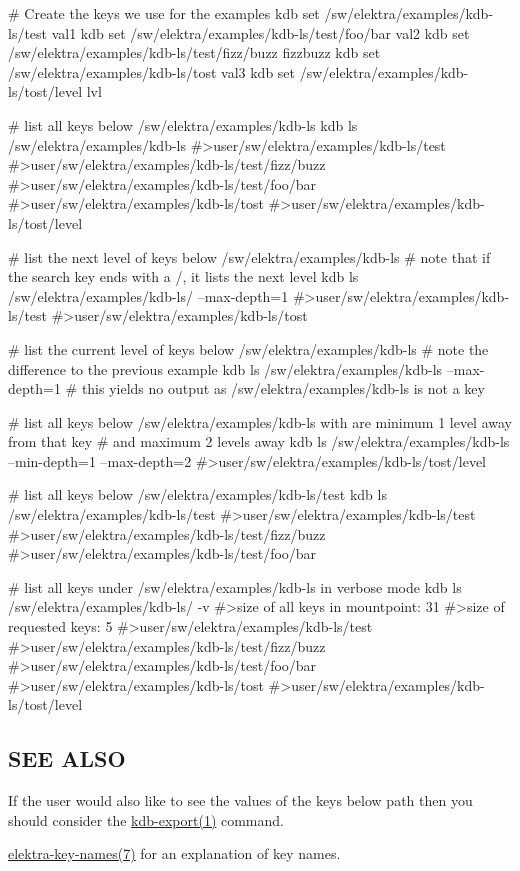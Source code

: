 \begin{DoxyCode}
# Create the keys we use for the examples
kdb set /sw/elektra/examples/kdb-ls/test val1
kdb set /sw/elektra/examples/kdb-ls/test/foo/bar val2
kdb set /sw/elektra/examples/kdb-ls/test/fizz/buzz fizzbuzz
kdb set /sw/elektra/examples/kdb-ls/tost val3
kdb set /sw/elektra/examples/kdb-ls/tost/level lvl 

# list all keys below /sw/elektra/examples/kdb-ls
kdb ls /sw/elektra/examples/kdb-ls
#>user/sw/elektra/examples/kdb-ls/test
#>user/sw/elektra/examples/kdb-ls/test/fizz/buzz
#>user/sw/elektra/examples/kdb-ls/test/foo/bar
#>user/sw/elektra/examples/kdb-ls/tost
#>user/sw/elektra/examples/kdb-ls/tost/level

# list the next level of keys below /sw/elektra/examples/kdb-ls
# note that if the search key ends with a /, it lists the next level
kdb ls /sw/elektra/examples/kdb-ls/ --max-depth=1
#>user/sw/elektra/examples/kdb-ls/test
#>user/sw/elektra/examples/kdb-ls/tost

# list the current level of keys below /sw/elektra/examples/kdb-ls
# note the difference to the previous example
kdb ls /sw/elektra/examples/kdb-ls --max-depth=1
# this yields no output as /sw/elektra/examples/kdb-ls is not a key

# list all keys below /sw/elektra/examples/kdb-ls with are minimum 1 level away from that key
# and maximum 2 levels away
kdb ls /sw/elektra/examples/kdb-ls --min-depth=1 --max-depth=2
#>user/sw/elektra/examples/kdb-ls/tost/level

# list all keys below /sw/elektra/examples/kdb-ls/test
kdb ls /sw/elektra/examples/kdb-ls/test
#>user/sw/elektra/examples/kdb-ls/test
#>user/sw/elektra/examples/kdb-ls/test/fizz/buzz
#>user/sw/elektra/examples/kdb-ls/test/foo/bar

# list all keys under /sw/elektra/examples/kdb-ls in verbose mode
kdb ls /sw/elektra/examples/kdb-ls/ -v
#>size of all keys in mountpoint: 31
#>size of requested keys: 5
#>user/sw/elektra/examples/kdb-ls/test
#>user/sw/elektra/examples/kdb-ls/test/fizz/buzz
#>user/sw/elektra/examples/kdb-ls/test/foo/bar
#>user/sw/elektra/examples/kdb-ls/tost
#>user/sw/elektra/examples/kdb-ls/tost/level
\end{DoxyCode}


\subsection*{S\+EE A\+L\+SO}


\begin{DoxyItemize}
\item If the user would also like to see the values of the keys below {\ttfamily path} then you should consider the \hyperlink{md_doc_help_kdb-export_doc_help_kdb-export_md}{kdb-\/export(1)} command.
\item \hyperlink{md_doc_help_elektra-key-names_doc_help_elektra-key-names_md}{elektra-\/key-\/names(7)} for an explanation of key names. 
\end{DoxyItemize}